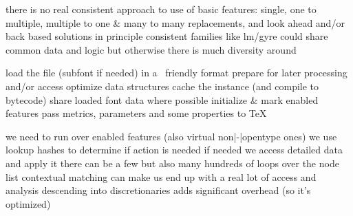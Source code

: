     \startitemize
        \startitem
            there is no real consistent approach to use of basic features:
            single, one to multiple, multiple to one & many to many replacements,
            and look ahead and/or back based solutions
        \stopitem
        \startitem
            in principle consistent families like lm/gyre could share common data
            and logic but otherwise there is much diversity around
        \stopitem
    \stopitemize

\stopsubject

\stoptitle

\starttitle[title={a few details}]

\startsubject[title={loading}]

    \startitemize
        \startitem
            load the file (subfont if needed) in a \Lua\ friendly format
        \stopitem
        \startitem
            prepare for later processing and/or access
        \stopitem
        \startitem
            optimize data structures
        \stopitem
        \startitem
            cache the instance (and compile to bytecode)
        \stopitem
        \startitem
            share loaded font data where possible
        \stopitem
        \startitem
            initialize & mark enabled features
        \stopitem
        \startitem
            pass metrics, parameters and some properties to \TeX
        \stopitem
    \stopitemize

\stopsubject

\startsubject[title={processing}]

    \startitemize
        \startitem
            we need to run over enabled features (also virtual non|-|opentype
            ones)
        \stopitem
        \startitem
            we use lookup hashes to determine if action is needed
        \stopitem
        \startitem
            if needed we access detailed data and apply it
        \stopitem
        \startitem
            there can be a few but also many hundreds of loops over the node list
        \stopitem
        \startitem
            contextual matching can make us end up with a real lot of access and
            analysis
        \stopitem
        \startitem
            descending into discretionaries adds significant overhead (so it's
            optimized)
        \stopitem
    \stopitemize

\stopsubject

\stoptitle

\starttitle[title={traditional fonts}]

